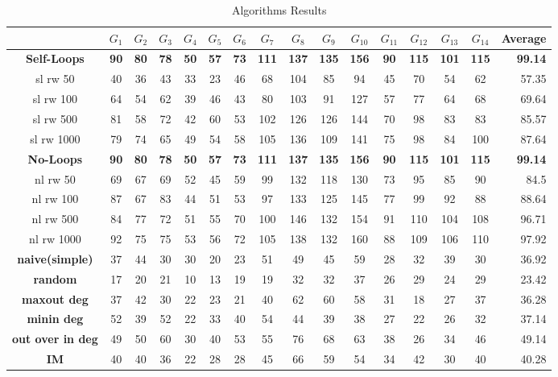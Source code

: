 \documentclass[sigconf,anonymous]{aamas}
\begin{document}
\begin{table}[hbpt]
  \caption{Algorithms Results}
  \label{tab:results}
  \begin{tabular}{c | c c c c c c | c c c c c c c c | r}\toprule
	&	\textbf{$G_1$}	&	\textbf{$G_2$}	&	\textbf{$G_3$}	&	\textbf{$G_4$}	&	\textbf{$G_5$}	&	\textbf{$G_6$}	&	\textbf{$G_7$}	&	\textbf{$G_8$}	&	\textbf{$G_9$}	&	\textbf{$G_{10}$}	&	\textbf{$G_{11}$}	&	\textbf{$G_{12}$}	&	\textbf{$G_{13}$}	&	\textbf{$G_{14}$}	&	\textbf{Average}	\\
	\midrule
\textbf{Self-Loops}	&	\textbf{90}	&	\textbf{80}	&	\textbf{78}	&	\textbf{50}	&	\textbf{57}	&	\textbf{73}	&	\textbf{111}	&	\textbf{137}	&	\textbf{135}	&	\textbf{156}	&	\textbf{90}	&	\textbf{115}	&	\textbf{101}	&	\textbf{115}	&	\textbf{99.14}	\\
sl rw 50	&	40	&	36	&	43	&	33	&	23	&	46	&	68	&	104	&	85	&	94	&	45	&	70	&	54	&	62	&	57.35	\\
sl rw 100	&	64	&	54	&	62	&	39	&	46	&	43	&	80	&	103	&	91	&	127	&	57	&	77	&	64	&	68	&	69.64	\\
sl rw 500	&	81	&	58	&	72	&	42	&	60	&	53	&	102	&	126	&	126	&	144	&	70	&	98	&	83	&	83	&	85.57	\\
sl rw 1000	&	79	&	74	&	65	&	49	&	54	&	58	&	105	&	136	&	109	&	141	&	75	&	98	&	84	&	100	&	87.64	\\
\midrule
 \textbf{No-Loops} 	&	\textbf{90}	&	\textbf{80}	&	\textbf{78}	&	\textbf{50}	&	\textbf{57}	&	\textbf{73}	&	\textbf{111}	&	\textbf{137}	&	\textbf{135}	&	\textbf{156}	&	\textbf{90}	&	\textbf{115}	&	\textbf{101}	&	\textbf{115}	&	\textbf{99.14}	\\
nl rw 50	&	69	&	67	&	69	&	52	&	45	&	59	&	99	&	132	&	118	&	130	&	73	&	95	&	85	&	90	&	84.5	\\
nl rw 100	&	87	&	67	&	83	&	44	&	51	&	53	&	97	&	133	&	125	&	145	&	77	&	99	&	92	&	88	&	88.64	\\
nl rw 500	&	84	&	77	&	72	&	51	&	55	&	70	&	100	&	146	&	132	&	154	&	91	&	110	&	104	&	108	&	96.71	\\
nl rw 1000	&	92	&	75	&	75	&	53	&	56	&	72	&	105	&	138	&	132	&	160	&	88	&	109	&	106	&	110	&	97.92	\\
\midrule
 \textbf{naive(simple)}	&	37	&	44	&	30	&	30	&	20	&	23	&	51	&	49	&	45	&	59	&	28	&	32	&	39	&	30	&	36.92	\\
 \textbf{random}	&	17	&	20	&	21	&	10	&	13	&	19	&	19	&	32	&	32	&	37	&	26	&	29	&	24	&	29	&	23.42	\\
 \textbf{maxout deg}	&	37	&	42	&	30	&	22	&	23	&	21	&	40	&	62	&	60	&	58	&	31	&	18	&	27	&	37	&	36.28	\\
 \textbf{minin deg}	&	52	&	39	&	52	&	22	&	33	&	40	&	54	&	44	&	39	&	38	&	27	&	22	&	26	&	32	&	37.14	\\
 \textbf{out over in deg}	&	49	&	50	&	60	&	30	&	40	&	53	&	55	&	76	&	68	&	63	&	38	&	26	&	34	&	46	&	49.14	\\
 \textbf{IM}	&	40	&	40	&	36	&	22	&	28	&	28	&	45	&	66	&	59	&	54	&	34	&	42	&	30	&	40	&	40.28	\\
    \bottomrule
  \end{tabular}
\end{table}
\end{document}

